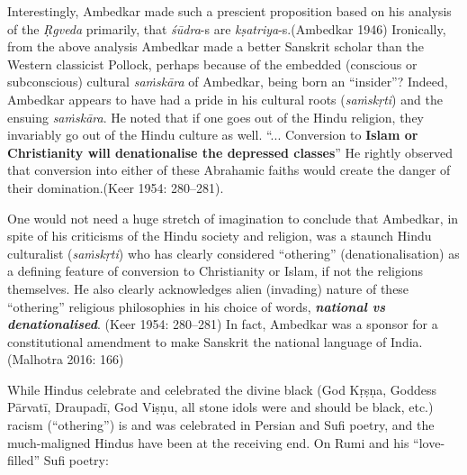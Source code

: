 Interestingly, Ambedkar made such a prescient proposition based on his analysis of the \textit{Ṛgveda} primarily, that \textit{śūdra}-s are \textit{kṣatriya}-s.\break (Ambedkar 1946) Ironically, from the above analysis Ambedkar made a better Sanskrit scholar than the Western classicist Pollock, perhaps because of the embedded (conscious or subconscious) cultural \textit{saṁskāra} of Ambedkar, being born an “insider”? Indeed, Ambedkar appears to have had a pride in his cultural roots (\textit{saṁskṛti}) and the ensuing \textit{saṁskāra}. He noted that if one goes out of the Hindu religion, they invariably go out of the Hindu culture as well. “... Conversion to \textbf{Islam or Christianity will denationalise the depressed classes}” He rightly observed that conversion into either of these Abrahamic faiths would create the danger of their domination.(Keer 1954: 280–281).

One would not need a huge stretch of imagination to conclude that Ambedkar, in spite of his criticisms of the Hindu society and religion, was a staunch Hindu culturalist (\textit{saṁskṛti}) who has clearly considered “othering” (denationalisation) as a defining feature of conversion to Christianity or Islam, if not the religions themselves. He also clearly acknowledges alien (invading) nature of these “othering” religious philosophies in his choice of words, \textit{\textbf{national vs denationalised}}. (Keer 1954: 280–281) In fact, Ambedkar was a sponsor for a constitutional amendment to make Sanskrit the national language of India. (Malhotra 2016: 166)

While Hindus celebrate and celebrated the divine black (God Kṛṣṇa, Goddess Pārvatī, Draupadī, God Viṣṇu, all stone idols were and should be black, etc.) racism (“othering”) is and was celebrated in Persian and Sufi poetry, and the much-maligned Hindus have been at the receiving end. On Rumi and his “love-filled” Sufi poetry:

